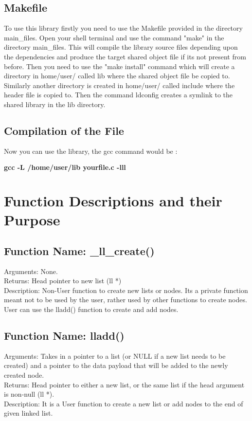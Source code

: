 \documentclass{article}
\begin{document}
  \subsection{Makefile}
  
  To use this library firstly you need to use the Makefile provided
  in the directory main\_files. Open your shell terminal and use the
  command "make" in the directory main\_files. This will compile the
  library source files depending upon the dependencies and produce the
  target shared object file if its not present from before. Then you
  need to use the "make install" command which will create a directory
  in home/user/ called lib where the shared object file be copied to.
  Similarly another directory is created in home/user/ called include
  where the header file is copied to. Then the command ldconfig
  creates a symlink to the shared library in the lib directory.
  \subsection{Compilation of the File}

  Now you can use the library, the gcc command would be :
  \begin{center}
    \textbf{gcc -L /home/user/lib yourfile.c -lll}
  \end{center}
  
  \section{\textbf{Function Descriptions and their Purpose}}
  \subsection{Function Name: \_ll\_create()}
  
  Arguments: None.  \\ 
  Returns:     Head pointer to new list (ll *) \\
  Description:   Non-User function to create new lists or nodes.
  Its a private function meant not to be used by the
  user, rather used by other functions to create nodes.
  User can use the lladd() function to create and add
  nodes. \\
  
  \subsection{Function Name: lladd()}
  Arguments:     Takes in a pointer to a list (or NULL if a new list
  needs to be created) and a pointer to the data payload that will
  be added to the newly created node. \\
  Returns:       Head pointer to either a new list, or the same list
  if the head argument is non-null (ll *). \\
  Description:   It is a User function to create a new list or
  add nodes to the end of given linked list. \\
  
\end{document}
